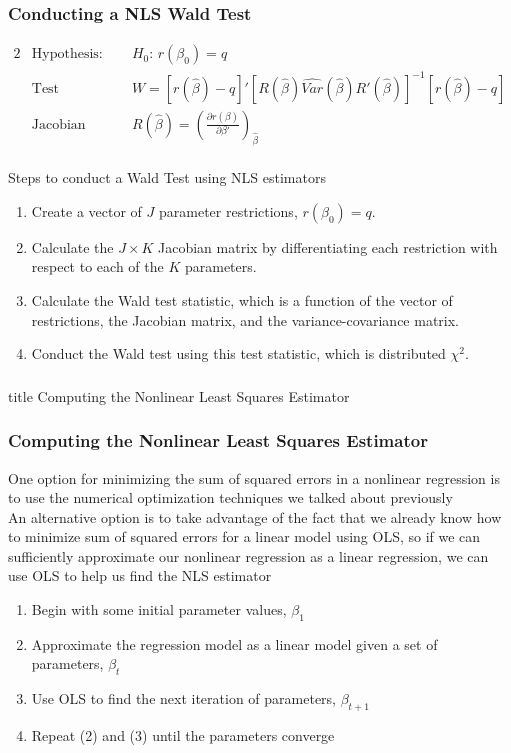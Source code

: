 \documentclass{beamer}
\begin{document}
\begin{frame}\frametitle{Conducting a NLS Wald Test}
	\begin{alignat*}{2}
		&\text{Hypothesis:} &&H_0 \text{: } r(\beta_0) = q \\
		&\text{Test statistic:} &&W = [r(\hat{\beta}) - q]' [ R(\hat{\beta}) \widehat{Var}(\hat{\beta}) R'(\hat{\beta})]^{-1} [r(\hat{\beta}) - q] \\
    	&\text{Jacobian matrix:} \quad &&R(\hat{\beta}) = \left( \frac{\partial r(\beta)}{\partial \beta'} \right)_{\hat{\beta}}
	\end{alignat*} \\
	\vspace{2ex}
    Steps to conduct a Wald Test using NLS estimators
    \begin{enumerate}
		\item Create a vector of $J$ parameter restrictions, $r(\beta_0) = q$.
		\item Calculate the $J \times K$ Jacobian matrix by differentiating each restriction with respect to each of the $K$ parameters.
		\item Calculate the Wald test statistic, which is a function of the vector of restrictions, the Jacobian matrix, and the variance-covariance matrix.
		\item Conduct the Wald test using this test statistic, which is distributed $\chi^2$.
	\end{enumerate}
\end{frame}

\begin{frame}\frametitle{}
    \vfill
    \centering
    \begin{beamercolorbox}[center]{title}
        \Large Computing the Nonlinear Least Squares Estimator
    \end{beamercolorbox}
    \vfill
\end{frame}

\begin{frame}\frametitle{Computing the Nonlinear Least Squares Estimator}
    One option for minimizing the sum of squared errors in a nonlinear regression is to use the numerical optimization techniques we talked about previously \\
    \vspace{3ex}
    An alternative option is to take advantage of the fact that we already know how to minimize sum of squared errors for a linear model using OLS, so if we can sufficiently approximate our nonlinear regression as a linear regression, we can use OLS to help us find the NLS estimator
    \begin{enumerate}
    	\item Begin with some initial parameter values, $\beta_1$
    	\item Approximate the regression model as a linear model given a set of parameters, $\beta_t$
    	\item Use OLS to find the next iteration of parameters, $\beta_{t + 1}$
    	\item Repeat (2) and (3) until the parameters converge
    \end{enumerate}
\end{frame}
\end{document}
